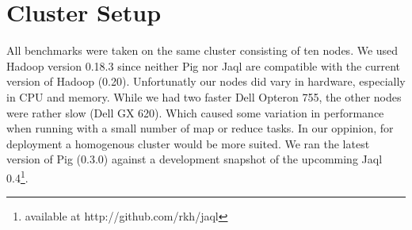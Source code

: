 \section{Cluster Setup}

All benchmarks were taken on the same cluster consisting of ten nodes. We used Hadoop version 0.18.3 since neither
Pig nor Jaql are compatible with the current version of Hadoop (0.20). Unfortunatly our nodes did vary in hardware,
especially in CPU and memory. While we had two faster Dell Opteron 755, the other nodes were rather slow (Dell GX 620).
Which caused some variation in performance when running with a small number of map or reduce tasks. In our oppinion,
for deployment a homogenous cluster would be more suited. We ran the latest version of Pig (0.3.0) against a development
snapshot of the upcomming Jaql 0.4\footnote{available at http://github.com/rkh/jaql}.